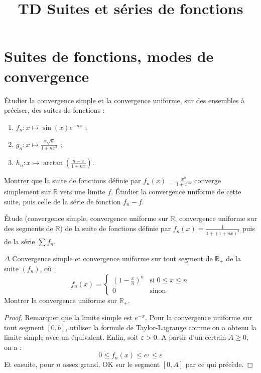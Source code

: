 \documentclass[french,a4paper]{article}
\title{TD Suites et séries de fonctions}
\newcommand{\R}{\mathbb{R}}
\theoremstyle{plain}
\theoremstyle{definition}
\theoremstyle{remark}
\begin{document}
\maketitle

\section{Suites de fonctions, modes de convergence}

\begin{ex}{}
	Étudier la convergence simple et la convergence uniforme, sur des ensembles à préciser, des suites de fonctions : 
	\begin{enumerate}
		\item $f_n:x\mapsto\sin(x)e^{-nx}$ ;
		\item $g_n:x\mapsto\displaystyle\frac{x\sqrt{n}}{1+nx^2}$ ;
		\item $h_n:x\mapsto\arctan\displaystyle\left(\frac{n-x}{1+nx}\right)$.
	\end{enumerate}
\end{ex}

\begin{ex}{}
	Montrer que la suite de fonctions définie par $\displaystyle f_n(x)=\frac{x^n}{1+x^{2n}}$ converge simplement sur $\R$ vers une limite $f$. Étudier la convergence uniforme de cette suite, puis celle de la série de fonction $f_n-f$.
\end{ex}

\begin{ex}{}
	Étude (convergence simple, convergence uniforme sur $\R$, convergence uniforme sur des segments de $\R$) de la suite de fonctions définie par $f_n(x)=\displaystyle\frac{1}{1+(1+nx)^2}$ puis de la série $\sum f_n$.
\end{ex}

\begin{ex}{$\Delta$}
	Convergence simple et convergence uniforme sur tout segment de $\R_+$ de la suite $(f_n)$, où : $$f_n(x)=\begin{cases}
		\displaystyle\left(1-\frac{x}{n}\right)^n&\text{si }0\leqslant x\leqslant n \\ 0&\text{sinon}
	\end{cases}$$ Montrer la convergence uniforme sur $\R_+$.
\end{ex}
\begin{proof}
	Remarquer que la limite simple est $e^{-x}$. Pour la convergence uniforme sur tout segment $[0,b]$, utiliser la formule de Taylor-Lagrange comme on a obtenu la limite simple avec un équivalent. Enfin, soit $\varepsilon>0$. A partir d'un certain $A\geqslant 0$, on a : $$0\leqslant f_n(x)\leqslant e^{_x}\leqslant \varepsilon$$ Et ensuite, pour $n$ assez grand, OK sur le segment $[0,A]$ par ce qui précède.
\end{proof}
\end{document}
